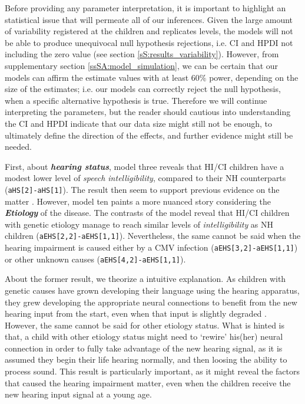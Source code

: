 Before providing any parameter interpretation, it is important to highlight an statistical issue that will permeate all of our inferences. Given the large amount of variability registered at the children and replicates levels, the models will not be able to produce unequivocal null hypothesis rejections, i.e. CI and HPDI not including the zero value (see section \ref{sS:results_variability}). However, from supplementary section \ref{ssSA:model_simulation}, we can be certain that our models can affirm the estimate values with at least $60\%$ power, depending on the size of the estimates; i.e. our models can correctly reject the null hypothesis, when a specific alternative hypothesis is true. Therefore we will continue interpreting the parameters, but the reader should cautious into understanding the CI and HPDI indicate that our data size might still not be enough, to ultimately define the direction of the effects, and further evidence might still be needed.

First, about \textbf{\textit{hearing status}}, model three reveals that HI/CI children have a modest lower level of \textit{speech intelligibility}, compared to their NH counterparts (\texttt{aHS[2]-aHS[1]}). The result then seem to support previous evidence on the matter \cite{Nicholas_et_al_2007, Castellanos_et_al_2014, Chin_et_al_2014, Geers_et_al_2016, Freeman_et_al_2017, Duchesne_et_al_2019, Grandon_et_al_2020}. However, model ten paints a more nuanced story considering the \textbf{\textit{Etiology}} of the disease. The contrasts of the model reveal that HI/CI children with genetic etiology manage to reach similar levels of \textit{intelligibility} as NH children (\texttt{aEHS[2,2]-aEHS[1,1]}). Nevertheless, the same cannot be said when the hearing impairment is caused either by a CMV infection (\texttt{aEHS[3,2]-aEHS[1,1]}) or other unknown causes (\texttt{aEHS[4,2]-aEHS[1,1]}).

About the former result, we theorize a intuitive explanation. As children with genetic causes have grown developing their language using the hearing apparatus, they grew developing the appropriate neural connections to benefit from the new hearing input from the start, even when that input is slightly degraded \cite{Drennan_et_al_2008}. However, the same cannot be said for other etiology status. What is hinted is that, a child with other etiology status might need to `rewire' his(her) neural connection in order to fully take advantage of the new hearing signal, as it is assumed they begin their life hearing normally, and then loosing the ability to process sound. This result is particularly important, as it might reveal the factors that caused the hearing impairment matter, even when the children receive the new hearing input signal at a young age.

